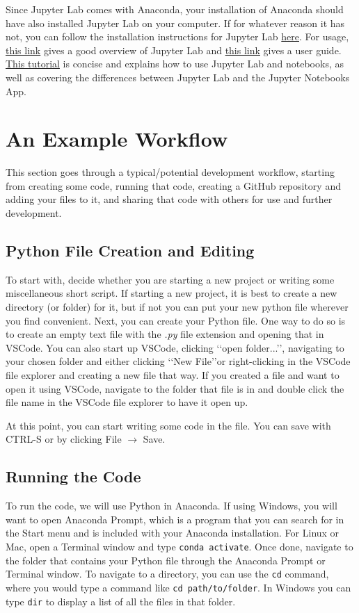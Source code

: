 \documentclass[letterpaper, 12pt]{article}
\begin{document}
Since Jupyter Lab comes with Anaconda, your installation of Anaconda should have also installed Jupyter Lab on your computer. If for whatever reason it has not, you can follow the installation instructions for Jupyter Lab \href{https://jupyterlab.readthedocs.io/en/stable/getting_started/installation.html}{here}. For usage, \href{https://jupyterlab.readthedocs.io/en/stable/getting_started/overview.html}{this link} gives a good overview of Jupyter Lab and \href{https://jupyterlab.readthedocs.io/en/stable/user/interface.html}{this link} gives a user guide. \href{https://ipython-books.github.io/36-introducing-jupyterlab/}{This tutorial} is concise and explains how to use Jupyter Lab and notebooks, as well as covering the differences between Jupyter Lab and the Jupyter Notebooks App.

\section{An Example Workflow}
This section goes through a typical/potential development workflow, starting from creating some code, running that code, creating a GitHub repository and adding your files to it, and sharing that code with others for use and further development.

\subsection{Python File Creation and Editing}
To start with, decide whether you are starting a new project or writing some miscellaneous short script. If starting a new project, it is best to create a new directory (or folder) for it, but if not you can put your new python file wherever you find convenient. Next, you can create your Python file. One way to do so is to create an empty text file with the \emph{.py} file extension and opening that in VSCode. You can also start up VSCode, clicking \lq\lq open folder...\rq\rq, navigating to your chosen folder and either clicking \lq\lq New File\rq\rq or right-clicking in the VSCode file explorer and creating a new file that way. If you created a file and want to open it using VSCode, navigate to the folder that file is in and double click the file name in the VSCode file explorer to have it open up.

At this point, you can start writing some code in the file. You can save with CTRL-S or by clicking File $\rightarrow$ Save.

\subsection{Running the Code}
To run the code, we will use Python in Anaconda. If using Windows, you will want to open Anaconda Prompt, which is a program that you can search for in the Start menu and is included with your Anaconda installation. For Linux or Mac, open a Terminal window and type \lstinline{conda activate}. Once done, navigate to the folder that contains your Python file through the Anaconda Prompt or Terminal window. To navigate to a directory, you can use the \lstinline{cd} command, where you would type a command like \lstinline{cd path/to/folder}. In Windows you can type \lstinline{dir} to display a list of all the files in that folder.
\end{document}
